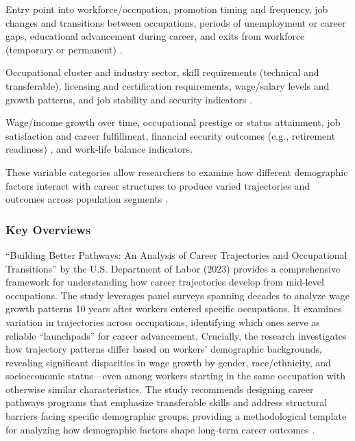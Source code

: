 \documentclass[../main.tex]{subfiles}
\begin{document}

Entry point into workforce/occupation, promotion timing and frequency, job changes and transitions between occupations, periods of unemployment or career gaps, educational advancement during career, and exits from workforce (temporary or permanent) \citep{nataraj2018career}.


Occupational cluster and industry sector, skill requirements (technical and transferable), licensing and certification requirements, wage/salary levels and growth patterns, and job stability and security indicators \citep{dol2023building}.


Wage/income growth over time, occupational prestige or status attainment, job satisfaction and career fulfillment, financial security outcomes (e.g., retirement readiness) \citep{lee2023middle}, and work-life balance indicators.

These variable categories allow researchers to examine how different demographic factors interact with career structures to produce varied trajectories and outcomes across population segments \citep{questionpro2024demographic}.

\subsubsection{Key Overviews}

``Building Better Pathways: An Analysis of Career Trajectories and Occupational Transitions'' by the U.S. Department of Labor (2023) provides a comprehensive framework for understanding how career trajectories develop from mid-level occupations. The study leverages panel surveys spanning decades to analyze wage growth patterns 10 years after workers entered specific occupations. It examines variation in trajectories across occupations, identifying which ones serve as reliable ``launchpads'' for career advancement. Crucially, the research investigates how trajectory patterns differ based on workers' demographic backgrounds, revealing significant disparities in wage growth by gender, race/ethnicity, and socioeconomic status—even among workers starting in the same occupation with otherwise similar characteristics. The study recommends designing career pathways programs that emphasize transferable skills and address structural barriers facing specific demographic groups, providing a methodological template for analyzing how demographic factors shape long-term career outcomes \citep{dol2023building}.
\end{document}
